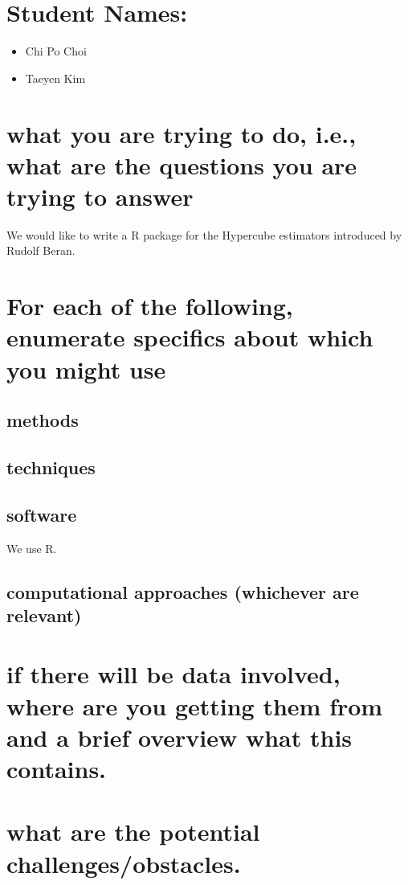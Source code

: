 \documentclass[draft]{article}
\begin{document}
\section{Student Names:}
\begin{itemize}
	\item Chi Po Choi
	\item Taeyen Kim
\end{itemize}

\section{what you are trying to do, i.e., what are the questions you are trying to answer}

We would like to write a R package for the Hypercube estimators introduced by Rudolf Beran.


\section{For each of the following, enumerate specifics about which you might use}

\subsection{methods}

\subsection{techniques}
\subsection{software}
We use R.

\subsection{computational approaches (whichever are relevant)}

\section{if there will be data involved, where are you getting them from and a brief overview what this contains.}

\section{what are the potential challenges/obstacles.}
\end{document}
